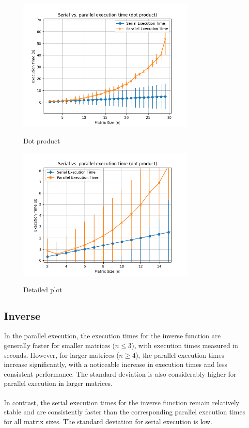 \begin{figure}[H]
    \includegraphics[width=0.8\textwidth, keepaspectratio]{../img/dot_2_30_5.png}
    \centering
    \label{fig:dot}
    \caption{Dot product}

    \includegraphics[width=0.8\textwidth, keepaspectratio]{../img/dot_2_30_5_detail.png}
    \centering
    \label{fig:dot_detail}
    \caption{Detailed plot}
\end{figure}  

\subsection{Inverse}
In the parallel execution, the execution times for the inverse function are generally faster for smaller matrices ($n \le 3$), with execution times measured in seconds. However, for larger matrices ($n \ge 4$), the parallel execution times increase significantly, with a noticeable increase in execution times and less consistent performance. The standard deviation is also considerably higher for parallel execution in larger matrices.
\\\\
In contrast, the serial execution times for the inverse function remain relatively stable and are consistently faster than the corresponding parallel execution times for all matrix sizes. The standard deviation for serial execution is low.


